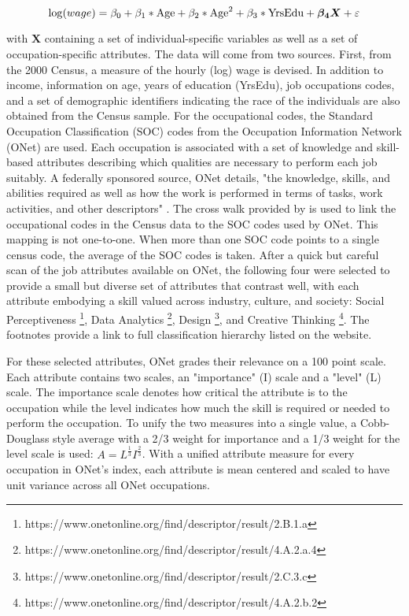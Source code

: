 \documentclass[12pt]{article}
\theoremstyle{definition}
\begin{document}
\begin{equation} \label{eq:mincer_equ}
  \log (wage) = \beta_{0} + \beta_{1} * \textnormal{Age} + \beta_{2} * \textnormal{Age}^{2} + \beta_{3} * \textnormal{YrsEdu} + \boldsymbol{\beta_{4}}\boldsymbol{X} + \varepsilon
\end{equation}

with $\boldsymbol{X}$ containing a set of individual-specific 
variables as well as a set of occupation-specific attributes. 
The data will come from two sources. First, from the 2000 Census,
a measure of the hourly (log) wage is devised. In addition to income,
information on age, years of education (YrsEdu), job occupations codes, 
and a set of demographic identifiers indicating the race of the
individuals are also obtained from the Census sample. For the occupational codes,
the Standard Occupation Classification (SOC) codes from the
Occupation Information Network (ONet) are used. Each occupation is
associated with a set of knowledge and skill-based
attributes describing which qualities are necessary to perform each
job suitably. A federally sponsored source, ONet details, "the knowledge,
skills, and abilities required as well as how the work is
performed in terms of tasks, work activities, and other descriptors"
\citep{ONET}. The cross walk provided by \citet{Crosswalk} is used to
link the occupational codes in the Census data to the SOC codes used
by ONet. This mapping is not one-to-one. When more than one SOC code
points to a single census code, the average of the SOC codes is taken.
After a quick but careful scan of the job attributes
available on ONet, the following four were selected to provide
a small but diverse set of attributes that contrast well, with each attribute
embodying a skill valued across industry, culture, and society:
Social Perceptiveness \footnote{https://www.onetonline.org/find/descriptor/result/2.B.1.a},
Data Analytics \footnote{https://www.onetonline.org/find/descriptor/result/4.A.2.a.4},
Design \footnote{https://www.onetonline.org/find/descriptor/result/2.C.3.c},
and Creative Thinking \footnote{https://www.onetonline.org/find/descriptor/result/4.A.2.b.2}.
The footnotes provide a link to  full classification hierarchy listed on the website. 

\bigskip

For these selected attributes, ONet grades their relevance on a
100 point scale. Each attribute contains two scales, an "importance" (I)
scale and a "level" (L) scale. The importance scale denotes how critical the
attribute is to the occupation while the level indicates how much the
skill is required or needed to perform the occupation. To unify the two
measures into a single value, a Cobb-Douglass style average with a
2/3 weight for importance and a 1/3 weight for the level scale is used:
$A = L^{\frac{1}{3}} I^{\frac{2}{3}}$. With a unified attribute measure
for every occupation in ONet's index, each attribute is mean centered and
scaled to have unit variance across all ONet occupations.
\end{document}
